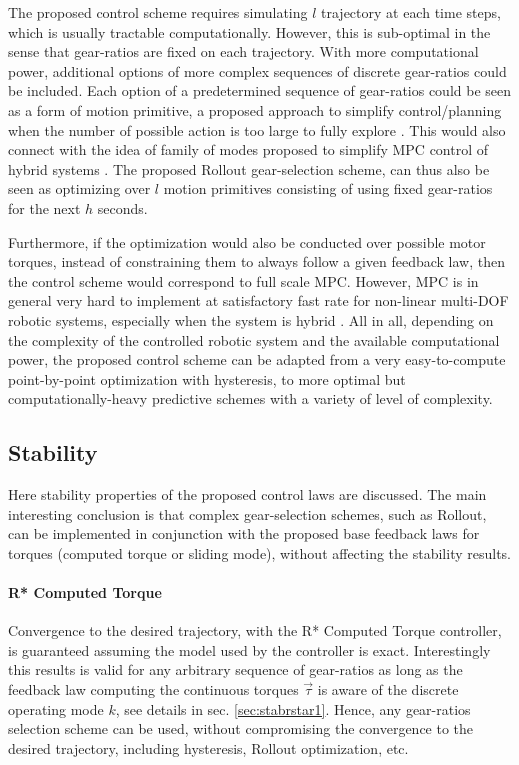 The proposed control scheme requires simulating $l$ trajectory at each time steps, which is usually tractable computationally. However, this is sub-optimal in the sense that gear-ratios are fixed on each trajectory. With more computational power, additional options of more complex sequences of discrete gear-ratios could be included. Each option of a predetermined sequence of gear-ratios could be seen as a form of motion primitive, a proposed approach to simplify control/planning when the number of possible action is too large to fully explore \cite{gray_predictive_2012}. This would also connect with the idea of family of modes proposed to simplify MPC control of hybrid systems \cite{_feedback_????}. The proposed Rollout gear-selection scheme, can thus also be seen as optimizing over $l$ motion primitives consisting of using fixed gear-ratios for the next $h$ seconds. 

Furthermore, if the optimization would also be conducted over possible motor torques, instead of constraining them to always follow a given feedback law, then the control scheme would correspond to full scale MPC. However, MPC is in general very hard to implement at satisfactory fast rate for non-linear multi-DOF robotic systems, especially when the system is hybrid \cite{_feedback_????}. 
%
All in all, depending on the complexity of the controlled robotic system and the available computational power, the proposed control scheme can be adapted from a very easy-to-compute point-by-point optimization with hysteresis, to more optimal but computationally-heavy predictive schemes with a variety of level of complexity. 


\subsection{Stability}

Here stability properties of the proposed control laws are discussed. The main interesting conclusion is that complex gear-selection schemes, such as Rollout, can be implemented in conjunction with the proposed base feedback laws for torques (computed torque or sliding mode), without affecting the stability results. 

\paragraph{R* Computed Torque} Convergence to the desired trajectory, with the R* Computed Torque controller, is guaranteed assuming the model used by the controller is exact. Interestingly this results is valid for any arbitrary sequence of gear-ratios as long as the feedback law computing the continuous torques $\vec{\tau}$ is aware of the discrete operating mode $k$, see details in sec. \ref{sec:stabrstar1}. Hence, any gear-ratios selection scheme can be used, without compromising the convergence to the desired trajectory, including hysteresis, Rollout optimization, etc.

